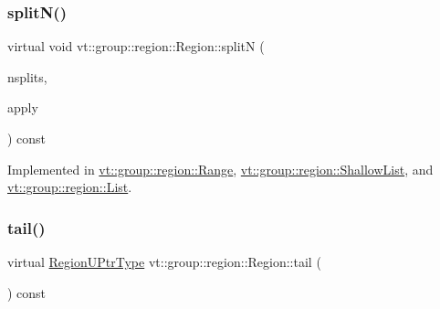 \mbox{\label{structvt_1_1group_1_1region_1_1_region_ae8660d4218b57e91664dedfa807cd936}} 
\subsubsection{\texorpdfstring{split\+N()}{splitN()}}
{\footnotesize\ttfamily virtual void vt\+::group\+::region\+::\+Region\+::splitN (\begin{DoxyParamCaption}\item[{int}]{nsplits,  }\item[{\hyperlink{structvt_1_1group_1_1region_1_1_region_a7c9e99b1157d2fe2f3e6fc36a1463a96}{Apply\+Fn\+Type}}]{apply }\end{DoxyParamCaption}) const\hspace{0.3cm}{\ttfamily [pure virtual]}}



Implemented in \hyperlink{structvt_1_1group_1_1region_1_1_range_a6fcfec2c3fabe024559c2f278a8d12e5}{vt\+::group\+::region\+::\+Range}, \hyperlink{structvt_1_1group_1_1region_1_1_shallow_list_ac41946e0f130b3d4b42f9edbe20f3605}{vt\+::group\+::region\+::\+Shallow\+List}, and \hyperlink{structvt_1_1group_1_1region_1_1_list_ad1950419288564d76527c24bd6d4f3a3}{vt\+::group\+::region\+::\+List}.

\mbox{\label{structvt_1_1group_1_1region_1_1_region_a7d5bc5711c1b7954e27defa4dc94af40}} 
\subsubsection{\texorpdfstring{tail()}{tail()}}
{\footnotesize\ttfamily virtual \hyperlink{structvt_1_1group_1_1region_1_1_region_ae5f42cf159116a3cf8bd65423eb01037}{Region\+U\+Ptr\+Type} vt\+::group\+::region\+::\+Region\+::tail (\begin{DoxyParamCaption}{ }\end{DoxyParamCaption}) const\hspace{0.3cm}{\ttfamily [pure virtual]}}



